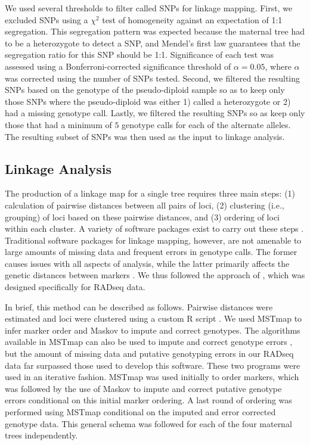 \documentclass[11pt]{article}
\begin{document}
We used several thresholds to filter called SNPs for linkage mapping. First, 
we excluded SNPs using a $\chi^2$ test of homogeneity against an expectation of 1:1 segregation. This segregation 
pattern was expected because the maternal tree had to be a heterozygote to detect a SNP, and Mendel's first law 
guarantees that the segregation ratio for this SNP should be 1:1. Significance of each test was 
assessed using a Bonferroni-corrected significance threshold of $\alpha = 0.05$, where $\alpha$ was corrected using the 
number of SNPs tested. Second, we filtered the resulting SNPs based on the genotype of the pseudo-diploid sample so as 
to keep only those SNPs where the pseudo-diploid was either 1) called a heterozygote or 2) had a missing genotype call.
Lastly, we filtered the resulting SNPs so as keep only those that had a minimum of $5$ genotype calls for each of the 
alternate alleles. The resulting subset of SNPs was then used as the input to linkage analysis. 

\subsection*{Linkage Analysis}\label{ss:linkage}
The production of a linkage map for a single tree requires three main steps: (1) calculation of 
pairwise distances between all pairs of loci, (2) clustering (i.e., grouping) of loci based on these pairwise distances, 
and (3) ordering of loci within each cluster.  A variety of software packages exist to carry out these steps 
\citep[e.g.,][]{VanOoijen:2011}. Traditional software packages for linkage mapping, however, are not amenable to large 
amounts of missing data and frequent errors in genotype calls. The former causes issues with all aspects of analysis, while 
the latter primarily affects the genetic distances between markers \citep{Cartwright:2007}. We thus followed the approach 
of \citet{Ward:2013}, which was designed specifically for RADseq data. 

In brief, this method can be described as follows. Pairwise distances were estimated and loci were clustered using a 
custom R script \citep{R:2013}. We used MSTmap \citep{Wu:2008a} 
to infer marker order and Maskov \citep{Ward:2013} to impute and correct genotypes. The algorithms available
in MSTmap can also be used to impute and correct genotype errors \citep[see][]{Wu:2008a}, but the amount of missing
data and putative genotyping errors in our RADseq data far surpassed those used to develop this software. These two programs
were used in an iterative fashion. MSTmap was used initially to order markers, which was followed by the use of Maskov
to impute and correct putative genotype errors conditional on this initial marker ordering. A last round of ordering 
was performed using MSTmap conditional on the imputed and error corrected genotype data. This general schema
was followed for each of the four maternal trees independently.
\end{document}
